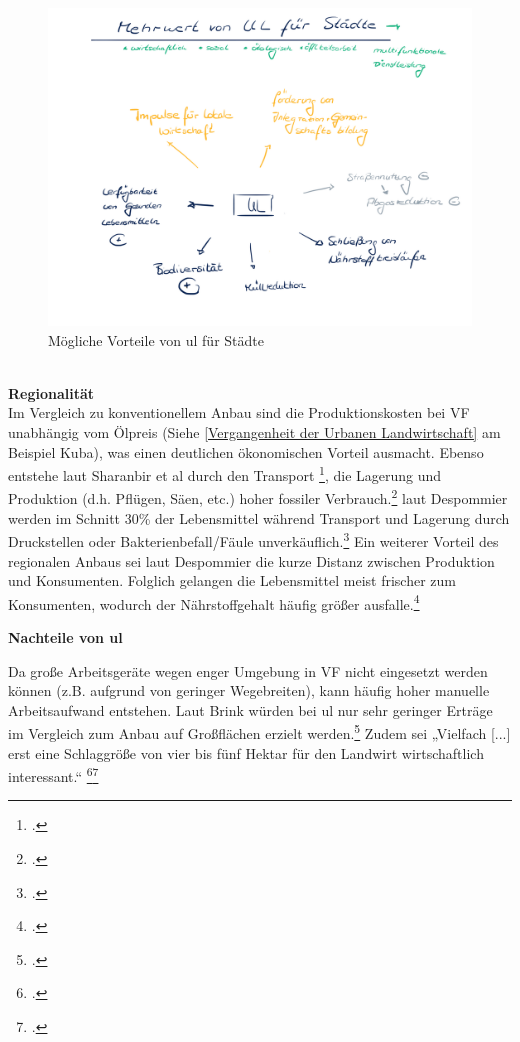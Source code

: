 \documentclass{scrartcl}
\begin{document}
\begin{figure}[htbp]
\centering
\includegraphics[width=14cm]{image_folder/moeglicheVorteileUL.png}
\caption{Mögliche Vorteile von \acs{ul} für Städte}
\label{fig:MoeglicheVorteilevonUL}
\end{figure}

\\
\textbf{Regionalität}
\\
Im Vergleich zu konventionellem Anbau sind die Produktionskosten bei VF unabhängig vom Ölpreis (Siehe \ref{Vergangenheit der Urbanen Landwirtschaft} am Beispiel Kuba), was einen deutlichen ökonomischen Vorteil ausmacht.
Ebenso entstehe laut Sharanbir et al durch den Transport \footcite[Vgl.][]{GrewalCanFood}, die Lagerung und Produktion (d.h. Pflügen, Säen, etc.) hoher fossiler Verbrauch.\footcite[]{2012TheEssay}  
laut Despommier werden im Schnitt 30\% der Lebensmittel während Transport und Lagerung durch Druckstellen oder Bakterienbefall/Fäule unverkäuflich.\footcite{Despommier2009TheFarms}
Ein weiterer Vorteil des regionalen Anbaus sei laut Despommier die kurze Distanz zwischen Produktion und Konsumenten. Folglich gelangen die Lebensmittel meist frischer zum Konsumenten, wodurch der Nährstoffgehalt häufig größer ausfalle.\footcite{Despommier2009TheFarms}


     
\textbf{Nachteile von \acs{ul}}
 
Da große Arbeitsgeräte wegen enger Umgebung in VF nicht eingesetzt werden können (z.B. aufgrund von geringer Wegebreiten), kann häufig hoher manuelle Arbeitsaufwand entstehen. Laut Brink würden bei \acs{ul} nur sehr geringer Erträge im Vergleich zum Anbau auf Großflächen erzielt werden.\footcite[Vgl.][S.8f]{BRINK2002LandwirtschaftsprogrammHannover}
Zudem sei „Vielfach [...] erst eine Schlaggröße von vier bis fünf Hektar für den Landwirt wirtschaftlich interessant.“ \footcite[S.27]{Schulz2013UrbaneLandmanagements}\footcite[zitiert nach]{STADTENTWICKLUNG2010OffenerLandwirtschaft}
 
\end{document}
